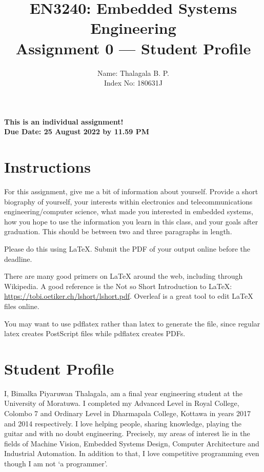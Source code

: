 \documentclass[11pt,letterpaper]{article}
\begin{document}
\title{EN3240: Embedded Systems Engineering \\Assignment 0 --- Student Profile}

\author{Name: Thalagala B. P. \\ Index No: 180631J}

\maketitle

\begin{center}
	\color{red}\bf This is an individual assignment! \\ Due Date: 25 August 2022 by 11.59 PM
\end{center}

\section*{Instructions}
%

For this assignment, give me a bit of information about yourself. Provide a short biography of yourself, your interests within electronics and telecommunications engineering/computer science, what made you interested in embedded systems, how you hope to use the information you learn in this class, and your goals after graduation. This should be between two and three paragraphs in length.

Please do this using LaTeX. Submit the PDF of your output online before the deadline.

There are many good primers on LaTeX around the web, including through Wikipedia. A good reference is the Not so Short Introduction to LaTeX: \url{https://tobi.oetiker.ch/lshort/lshort.pdf}. Overleaf is a great tool to edit LaTeX files online.

You may want to use pdflatex rather than latex to generate the file, since regular latex creates PostScript files while pdflatex creates PDFs.


\newpage
\section*{Student Profile}
I, Bimalka Piyaruwan Thalagala, am a final year engineering student at the University of Moratuwa. I completed my Advanced Level in Royal College, Colombo 7 and Ordinary Level in Dharmapala College, Kottawa in years 2017 and 2014 respectively. I love helping people, sharing knowledge, playing the guitar and with no doubt engineering. Precisely, my areas of interest lie in the fields of Machine Vision, Embedded Systems Design, Computer Architecture and Industrial Automation. In addition to that, I love competitive programming even though I am not `a programmer'.\\
\end{document}
